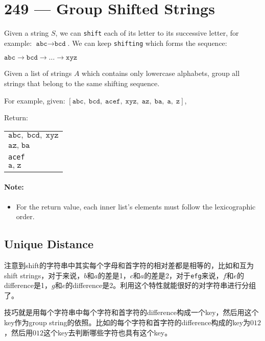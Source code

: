 \section{249 --- Group Shifted Strings}
Given a string $S$, we can \texttt{shift} each of its letter to its successive letter, for example: $\texttt{abc} \longrightarrow \texttt{bcd}$. We can keep \texttt{shifting} which forms the sequence:
\par
$\texttt{abc} \longrightarrow \texttt{bcd} \longrightarrow \ldots \longrightarrow \texttt{xyz}$
\par
Given a list of strings $A$ which contains only lowercase alphabets, group all strings that belong to the same shifting sequence.
\par
For example, given: 
$[\texttt{abc},\; \texttt{bcd},\; \texttt{acef},\; \texttt{xyz},\; \texttt{az},\; \texttt{ba},\; \texttt{a},\; \texttt{z}]$,
\par
Return:
\begin{table}[H]
\begin{tabular}{l}
$\texttt{abc},\;\texttt{bcd},\;\texttt{xyz}$ \\
$\texttt{az},\;\texttt{ba}$\\
\texttt{acef}\\
$\texttt{a},\;\texttt{z}$
\end{tabular}
\end{table}

\paragraph{Note:} 
\begin{itemize}
\item For the return value, each inner list's elements must follow the lexicographic order.
\end{itemize}
\subsection{Unique Distance}
注意到shift的字符串中其实每个字母和首字符的相对差都是相等的，比如和互为shift strings，对于来说，$b$和$a$的差是1，$c$和$a$的差是2，对于\texttt{efg}来说，$f$和$e$的difference是1，$g$和$e$的difference是2。利用这个特性就能很好的对字符串进行分组了。

技巧就是用每个字符串中每个字符和首字符的difference构成一个key，然后用这个key作为group string的依照。比如的每个字符和首字符的difference构成的key为$012$，然后用$012$这个key去判断哪些字符也具有这个key。

